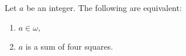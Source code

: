 Let $a$ be an integer. The following are equivalent:

\begin{enumerate}
\item[(i)] $a \in \omega$,
\item[(ii)] $a$ is a sum of four squares.
\end{enumerate}
